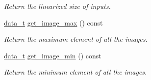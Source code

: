 \begin{DoxyCompactItemize}
\begin{DoxyCompactList}\small\item\em Return the linearized size of inputs. \end{DoxyCompactList}\item 
\hyperlink{classlbann_1_1data__reader__jag_a7377d6c02c455f019a378489b9b8eab4}{data\+\_\+t} \hyperlink{classlbann_1_1data__reader__jag_abf4e3248e1f319202d0bb370316f0d8a}{get\+\_\+image\+\_\+max} () const
\begin{DoxyCompactList}\small\item\em Return the maximum element of all the images. \end{DoxyCompactList}\item 
\hyperlink{classlbann_1_1data__reader__jag_a7377d6c02c455f019a378489b9b8eab4}{data\+\_\+t} \hyperlink{classlbann_1_1data__reader__jag_a7fd3f8e1b26f624bc91fac8fe4cff85e}{get\+\_\+image\+\_\+min} () const
\begin{DoxyCompactList}\small\item\em Return the minimum element of all the images. \end{DoxyCompactList}\end{DoxyCompactItemize}
